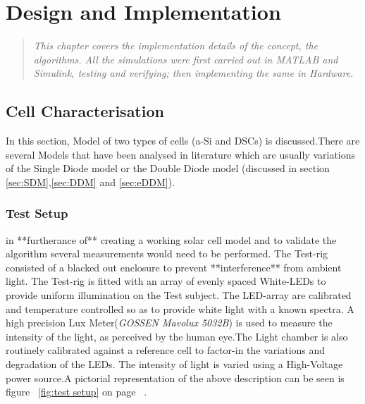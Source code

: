 \chapter{Design and Implementation}
\begin{quote} 
\it This chapter covers the implementation details of the concept, the algorithms. All the simulations were first carried out in MATLAB{\textregistered} and Simulink{\textregistered}, testing and verifying; then implementing the same in Hardware.
\end{quote}

\section{Cell Characterisation}
In this section, Model of two types of cells (\ac{a-Si} and \ac{DSCs}) is discussed.There are several Models that have been analysed in literature which are usually variations of the Single Diode model or the Double Diode model (discussed in section \ref{sec:SDM},\ref{sec:DDM} and \ref{sec:eDDM}).
 
\subsection{Test Setup}
in **furtherance of** creating a working solar cell model and to validate the algorithm several measurements would need to be performed. The Test-rig consisted of a blacked out enclosure to prevent **interference** from ambient light. The Test-rig is fitted with an array of evenly spaced White-\ac{LED}s to provide uniform illumination on the Test subject. The \ac{LED}-array are calibrated and temperature controlled so as to provide white light with a known spectra. A high precision Lux Meter(\textit{GOSSEN Mavolux 5032B}) is used to measure the  intensity of the light, as perceived by the human eye.The Light chamber is also routinely calibrated against a reference cell to factor-in the variations and degradation of the \ac{LED}s. The intensity of light is varied using a High-Voltage power source.A pictorial representation of the above description can be seen is figure  ~\ref{fig:test setup} on page ~\pageref{fig:test setup}. \\

